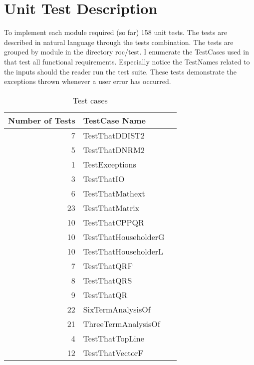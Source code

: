\documentclass[12pt, titlepage]{article}
\newcommand{\rref}[1]{(R\ref{#1})}
\begin{document}
\section{Unit Test Description}

To implement each module required (so far) 158 unit tests. The tests are described in natural language
through the tests  combination. The tests are grouped by module in the directory
roc/test. I enumerate the TestCases used in  that test all functional requirements.
Especially notice the TestNames related to the inputs should the reader run the test suite.
These tests demonstrate the exceptions thrown whenever a user error has occurred.


\begin{table}[!ht]
\centering
\begin{tabular}{r p{} p{}}
\toprule
\textbf{Number of Tests} & \textbf{TestCase Name}\\
\midrule
  7 &  TestThatDDIST2\\
 5  &  TestThatDNRM2\\
 1  &  TestExceptions\\
 3  &  TestThatIO\\
 6  &  TestThatMathext\\
 23 &  TestThatMatrix\\
 10 &  TestThatCPPQR\\
 10 &  TestThatHouseholderG\\
 10 &  TestThatHouseholderL\\
 7  &  TestThatQRF\\
 8  &  TestThatQRS\\
 9  &  TestThatQR\\
 22 &  SixTermAnalysisOf\\
 21 &  ThreeTermAnalysisOf\\
 4  &  TestThatTopLine\\
 12 &  TestThatVectorF\\
  \bottomrule

\end{tabular}
  \caption{Test cases}
\label{tb:testcases}
\end{table}
\end{document}
